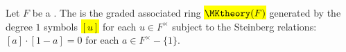 \begin{definition} \label{definition:milnor_K_theory_of_a_field}
    Let $F$ be a . The  is the graded associated ring \hl{$\MKtheory(F)$} generated by the degree $1$ symbols \hl{$[u]$} for each $u \in F^\times$ subject to the Steinberg relations: $[a] \cdot [1-a] = 0$ for each $a \in F^\times - \{1\}$.
\end{definition}